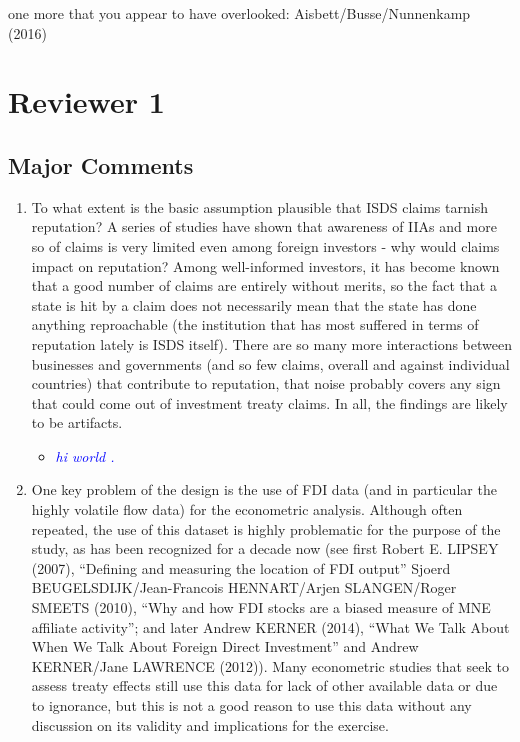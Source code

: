 one more that you appear to have overlooked: Aisbett/Busse/Nunnenkamp (2016)

\section{Reviewer 1}

\subsection{Major Comments}

\begin{enumerate}
	\item To what extent is the basic assumption plausible that ISDS claims tarnish reputation? A series of studies have shown that awareness of IIAs and more so of claims is very limited even among foreign investors - why would claims impact on reputation? Among well-informed investors, it has become known that a good number of claims are entirely without merits, so the fact that a state is hit by a claim does not necessarily mean that the state has done anything reproachable (the institution that has most suffered in terms of reputation lately is ISDS itself). There are so many more interactions between businesses and governments (and so few claims, overall and against individual countries) that contribute to reputation, that noise probably covers any sign that could come out of investment treaty claims. In all, the findings are likely to be artifacts. 
	\begin{itemize}
		\item \textcolor{blue}{ \emph{ hi world . }}
	\end{itemize}
	\item One key problem of the design is the use of FDI data (and in particular the highly volatile flow data) for the econometric analysis. Although often repeated, the use of this dataset is highly problematic for the purpose of the study, as has been recognized for a decade now (see first Robert E. LIPSEY (2007), ``Defining and measuring the location of FDI output'' Sjoerd BEUGELSDIJK/Jean-Francois HENNART/Arjen SLANGEN/Roger SMEETS (2010), ``Why and how FDI stocks are a biased measure of MNE affiliate activity''; and later Andrew KERNER (2014), ``What We Talk About When We Talk About Foreign Direct Investment'' and Andrew KERNER/Jane LAWRENCE (2012)). Many econometric studies that seek to assess treaty effects still use this data for lack of other available data or due to ignorance, but this is not a good reason to use this data without any discussion on its validity and implications for the exercise. 

\end{enumerate}
